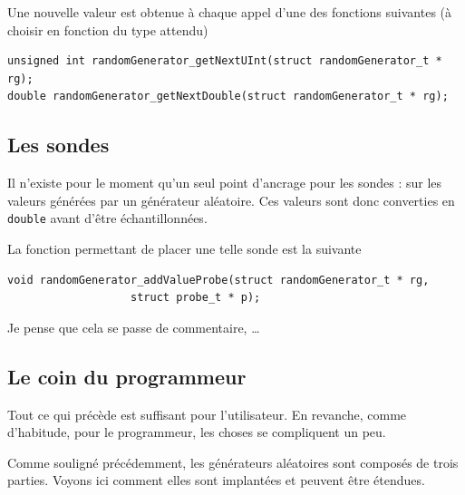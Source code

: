 
   Une nouvelle valeur est obtenue à chaque appel d'une des fonctions
suivantes (à choisir en fonction du type attendu)

\begin{verbatim}
unsigned int randomGenerator_getNextUInt(struct randomGenerator_t * rg);
double randomGenerator_getNextDouble(struct randomGenerator_t * rg);
\end{verbatim}

%
\subsection{Les sondes}

   Il n'existe pour le moment qu'un seul point d'ancrage pour les
sondes : sur les valeurs générées par un générateur aléatoire. Ces
valeurs sont donc converties en {\tt double} avant d'être
échantillonnées.

   La fonction permettant de placer une telle sonde est la suivante 

\begin{verbatim}
void randomGenerator_addValueProbe(struct randomGenerator_t * rg,
				   struct probe_t * p);
\end{verbatim}

   Je pense que cela se passe de commentaire, \ldots

%
\subsection{Le coin du programmeur}

   Tout ce qui précède est suffisant pour l'utilisateur. En revanche,
comme d'habitude, pour le programmeur, les choses se compliquent un
peu.

   Comme souligné précédemment, les générateurs aléatoires sont
composés de trois parties. Voyons ici comment elles sont implantées et
peuvent être étendues.

%
